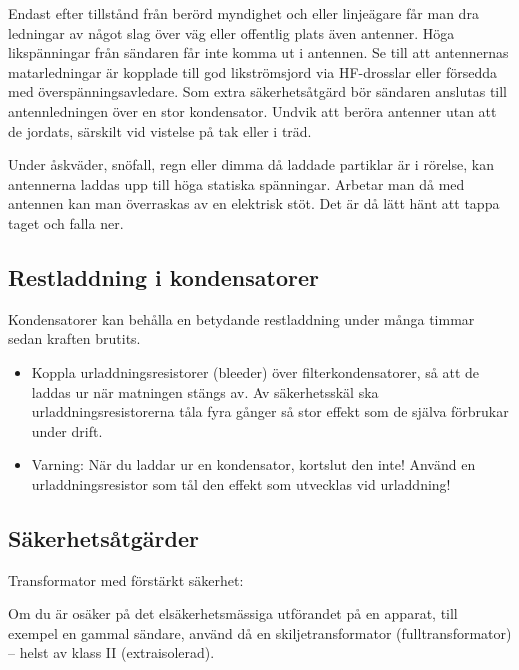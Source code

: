 Endast efter tillstånd från berörd myndighet och eller linjeägare får
man dra ledningar av något slag över väg eller offentlig plats även antenner.
Höga likspänningar från sändaren får inte komma ut i antennen.
Se till att antennernas matarledningar är kopplade till god likströmsjord
via HF-drosslar eller försedda med överspänningsavledare.
Som extra säkerhetsåtgärd bör sändaren anslutas till antennledningen över en
stor kondensator.
Undvik att beröra antenner utan att de jordats, särskilt vid vistelse
på tak eller i träd.

Under åskväder, snöfall, regn eller dimma då laddade partiklar är i
rörelse, kan antennerna laddas upp till höga statiska spänningar.
Arbetar man då med antennen kan man överraskas av en elektrisk stöt.
Det är då lätt hänt att tappa taget och falla ner.

\subsection{Restladdning i kondensatorer}

Kondensatorer kan behålla en betydande restladdning under många timmar
sedan kraften brutits.

\begin{itemize}
\item Koppla urladdningsresistorer (bleeder) över filterkondensatorer,
  så att de laddas ur när matningen stängs av.
  Av säkerhetsskäl ska urladdningsresistorerna tåla fyra gånger så stor effekt
  som de själva förbrukar under drift.
\item Varning: När du laddar ur en kondensator, kortslut den inte!
  Använd en urladdningsresistor som tål den effekt som utvecklas vid urladdning!
\end{itemize}

\subsection{Säkerhetsåtgärder}

Transformator med förstärkt säkerhet:

\begin{center}
\begin{minipage}{0.19\columnwidth}
\Huge{\selectfont{}\relax}
\end{minipage}
\begin{minipage}{0.7\columnwidth}
Om du är osäker på det elsäkerhetsmässiga utförandet på en
apparat, till exempel en gammal sändare, använd då en skiljetransformator
(fulltransformator) -- helst av klass II (extraisolerad).
\end{minipage}
\end{center}


